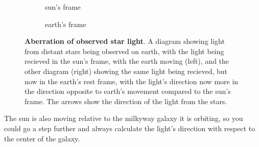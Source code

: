 \begin{figure}[H]
	\centering
	\begin{subfigure}{0.45\textwidth}
		\centering
		\caption{sun's frame}
		\label{subfig_1: suns frame}
	\end{subfigure}
	\begin{subfigure}{0.45\textwidth}
		\centering
		\caption{earth's frame}
			\label{subfig_2: earths frame}
	\end{subfigure}
	\caption{\textbf{Aberration of observed star light}. A diagram showing light from distant stars being observed on earth, with the light being recieved in the sun's frame, with the earth moving (left), and the other diagram (right) showing the same light being recieved, but now in the earth's rest frame, with the light's direction now more in the direction opposite to earth's movement compared to the sun's frame. The arrows show the direction of the light from the stars.}
	\label{fig: title}
\end{figure}

The sun is also moving relative to the milkyway galaxy it is orbiting, so you could go a step further and always calculate the light's direction with respect to the center of the galaxy.

